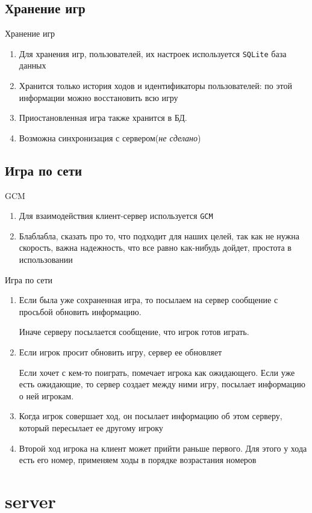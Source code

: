 \documentclass{beamer}
\def\t{\texttt}
\begin{document}
\subsection{Хранение игр}
\begin{frame}[t]{Хранение игр}
    \begin{enumerate}
        \item
            Для хранения игр, пользователей, их настроек используется \t{SQLite} база данных
        \pause
        \item
            Хранится только история ходов и идентификаторы пользователей: по этой информации можно восстановить всю игру
        \pause
        \item
            Приостановленная игра также хранится в БД.
        \pause
        \item
            Возможна синхронизация с сервером(\textit{не сделано})
    \end{enumerate}
\end{frame}

\subsection{Игра по сети}
\begin{frame}[t]{GCM}
    \begin{enumerate}
        \item
            Для взаимодействия клиент-сервер используется \t{GCM}
                        
        \item
            Блаблабла, сказать про то, что подходит для наших целей, так как не нужна скорость, важна надежность, что все равно как-нибудь дойдет, простота в использовании
    \end{enumerate}
\end{frame}
\begin{frame}[t]{Игра по сети}
    \begin{enumerate}
        \item
            Если была уже сохраненная игра, то посылаем на сервер сообщение с просьбой обновить информацию.
                
            Иначе серверу посылается сообщение, что игрок готов играть.
        \pause
        \item
            Если игрок просит обновить игру, сервер ее обновляет

            Если хочет с кем-то поиграть, помечает игрока как ожидающего. Если уже есть ожидающие, то сервер создает между ними игру, посылает информацию о ней игрокам.
        \pause
        \item
            Когда игрок совершает ход, он посылает информацию об этом серверу, который пересылает ее другому игроку
        \pause
        \item
            Второй ход игрока на клиент может прийти раньше первого. Для этого у хода есть его номер, применяем ходы в порядке возрастания номеров
    \end{enumerate}
\end{frame}
\section{server}
\end{document}
